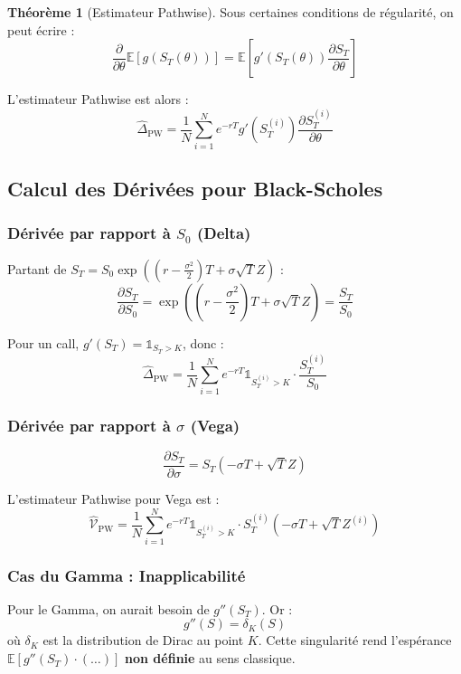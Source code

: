 \documentclass[a4paper,11pt]{article}
\theoremstyle{definition}
\newtheorem{theoreme}{Théorème}[section]
\begin{document}
\begin{theoreme}[Estimateur Pathwise]
Sous certaines conditions de régularité, on peut écrire :
$$\frac{\partial}{\partial \theta} \mathbb{E}[g(S_T(\theta))] = \mathbb{E}\left[ g'(S_T(\theta)) \frac{\partial S_T}{\partial \theta} \right]$$

L'estimateur Pathwise est alors :
$$\hat{\Delta}_{\text{PW}} = \frac{1}{N} \sum_{i=1}^N e^{-rT} g'(S_T^{(i)}) \frac{\partial S_T^{(i)}}{\partial \theta}$$
\end{theoreme}

\subsection{Calcul des Dérivées pour Black-Scholes}

\subsubsection{Dérivée par rapport à $S_0$ (Delta)}

Partant de $S_T = S_0 \exp\left((r - \frac{\sigma^2}{2})T + \sigma\sqrt{T} Z\right)$ :
$$\frac{\partial S_T}{\partial S_0} = \exp\left(\left(r - \frac{\sigma^2}{2}\right)T + \sigma\sqrt{T} Z\right) = \frac{S_T}{S_0}$$

Pour un call, $g'(S_T) = \mathbb{1}_{S_T > K}$, donc :
$$\hat{\Delta}_{\text{PW}} = \frac{1}{N} \sum_{i=1}^N e^{-rT} \mathbb{1}_{S_T^{(i)} > K} \cdot \frac{S_T^{(i)}}{S_0}$$

\subsubsection{Dérivée par rapport à $\sigma$ (Vega)}

$$\frac{\partial S_T}{\partial \sigma} = S_T \left( -\sigma T + \sqrt{T} Z \right)$$

L'estimateur Pathwise pour Vega est :
$$\hat{\mathcal{V}}_{\text{PW}} = \frac{1}{N} \sum_{i=1}^N e^{-rT} \mathbb{1}_{S_T^{(i)} > K} \cdot S_T^{(i)} \left( -\sigma T + \sqrt{T} Z^{(i)} \right)$$

\subsubsection{Cas du Gamma : Inapplicabilité}

Pour le Gamma, on aurait besoin de $g''(S_T)$. Or :
$$g''(S) = \delta_K(S)$$
où $\delta_K$ est la distribution de Dirac au point $K$. Cette singularité rend l'espérance $\mathbb{E}[g''(S_T) \cdot (\ldots)]$ \textbf{non définie} au sens classique.
\end{document}
